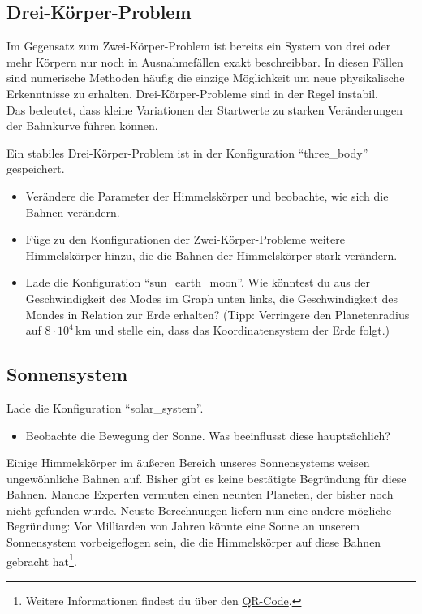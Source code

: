 \documentclass{scrartcl}
\begin{document}
        \subsection*{Drei-Körper-Problem}
        Im Gegensatz zum Zwei-Körper-Problem ist bereits ein System von drei oder mehr Körpern nur noch in Ausnahmefällen exakt beschreibbar.
        In diesen Fällen sind numerische Methoden häufig die einzige Möglichkeit um neue physikalische Erkenntnisse zu erhalten.
        Drei-Körper-Probleme sind in der Regel instabil.\\
        
        \noindent Das bedeutet, dass kleine Variationen der Startwerte zu starken Veränderungen der Bahnkurve führen können.
        
        Ein stabiles Drei-Körper-Problem ist in der Konfiguration "`three\_body"' gespeichert.
        \begin{itemize}
            \item Verändere die Parameter der Himmelskörper und beobachte, wie sich die Bahnen verändern.
            \item Füge zu den Konfigurationen der Zwei-Körper-Probleme weitere Himmelskörper hinzu, die die Bahnen der Himmelskörper stark verändern. 
            \item Lade die Konfiguration "`sun\_earth\_moon"'. Wie könntest du aus der Geschwindigkeit des Modes im Graph unten links, die Geschwindigkeit des Mondes in Relation zur Erde erhalten? 
            (Tipp: Verringere den Planetenradius auf $8\cdot10^4\,$km und stelle ein, dass das Koordinatensystem der Erde folgt.)
        \end{itemize}
        \subsection*{Sonnensystem}
        Lade die Konfiguration "`solar\_system"'.
        \begin{itemize}
            \item Beobachte die Bewegung der Sonne. Was beeinflusst diese hauptsächlich? 
        \end{itemize}
        Einige Himmelskörper im äußeren Bereich unseres Sonnensystems weisen ungewöhnliche Bahnen auf.
        Bisher gibt es keine bestätigte Begründung für diese Bahnen. 
        Manche Experten vermuten einen neunten Planeten, der bisher noch nicht gefunden wurde.
        Neuste Berechnungen liefern nun eine andere mögliche Begründung:
        Vor Milliarden von Jahren könnte eine Sonne an unserem Sonnensystem vorbeigeflogen sein, die die Himmelskörper auf diese Bahnen gebracht hat\footnote{Weitere Informationen findest du über den \href{https://www.fr.de/wissen/simulationen-aus-deutschland-zeigen-planet-koennte-etwas-ganz-anderes-sein-zr-93300641.html}{QR-Code}.}.
\end{document}
